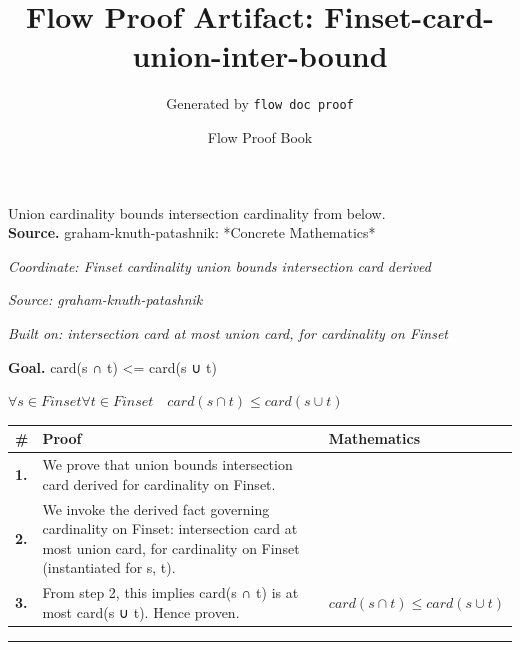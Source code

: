 \documentclass[11pt]{article}
\title{Flow Proof Artifact: Finset-card-union-inter-bound}
\author{Generated by \texttt{flow doc proof}}
\date{Flow Proof Book}
\theoremstyle{definition}
\begin{document}
\maketitle
Union cardinality bounds intersection cardinality from below.\\[0.5em]
\textbf{Source.} graham-knuth-patashnik: *Concrete Mathematics*\\[0.5em]
\bigskip
{}\par
\smallskip\noindent\textit{Coordinate: Finset \cdot cardinality \cdot union bounds intersection card derived}\par
\smallskip\noindent\textit{Source: graham-knuth-patashnik}\par
\smallskip\noindent\textit{Built on: intersection card at most union card, for cardinality on Finset}\par
\medskip
\noindent\textbf{Goal.} card(s ∩ t) <= card(s ∪ t)\par
\noindent$\displaystyle \forall s \in Finset \forall t \in Finset\quad card(s ∩ t) \le card(s ∪ t)$\par
\medskip
\noindent
\begin{tabular}{@{} >{\raggedright\arraybackslash}p{} >{\raggedright\arraybackslash}p{} >{\raggedleft\arraybackslash}p{} @{}}
\textbf{\#} & \textbf{Proof} & \textbf{Mathematics} \\
\midrule
\textbf{1.} & We prove that union bounds intersection card derived for cardinality on Finset. & \\[0.45em]
\textbf{2.} & We invoke the derived fact governing cardinality on Finset: intersection card at most union card, for cardinality on Finset (instantiated for s, t). & \\[0.45em]
\textbf{3.} & From step 2, this implies card(s ∩ t) is at most card(s ∪ t). Hence proven. & $\displaystyle card(s ∩ t) \le card(s ∪ t)$ \\[0.45em]
\bottomrule
\end{tabular}
\label{thm:Finset-cardinality-union_bounds_intersection_card_derived}
\par\medskip\hrule
\end{document}
